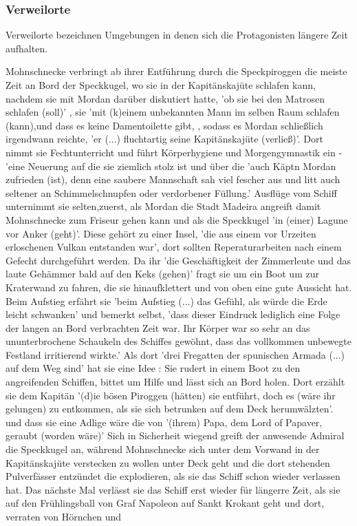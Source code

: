 \subsubsection{Verweilorte}
Verweilorte bezeichnen Umgebungen in denen sich die Protagonisten längere Zeit aufhalten.

Mohnschnecke verbringt ab ihrer Entführung durch die Speckpiroggen \cite[S.32]{pir} die meiste Zeit an Bord der Speckkugel, wo sie in der Kapitänskajüte schlafen kann, nachdem sie mit Mordan darüber diskutiert hatte, 'ob sie bei den Matrosen schlafen (soll)' \cite[S.78]{pir}, sie 'mit (k)einem unbekannten Mann im selben Raum schlafen (kann),\cite[S.78]{pir}und dass es keine Damentoilette gibt, \cite[S.78]{pir}, sodass es Mordan schließlich irgendwann reichte, \cite[S.78]{pir} 'er (...) fluchtartig seine Kapitänskajüte (verließ)'.\cite[S.78]{pir} Dort nimmt sie Fechtunterricht \cite[S.127f]{pir} und führt Körperhygiene und Morgengymnastik ein - 'eine Neuerung auf die sie ziemlich stolz ist \cite[S.181]{pir} und über die 'auch Käptn Mordan zufrieden (ist), denn eine saubere Mannschaft sah viel fescher aus und litt auch seltener an Schimmelschnupfen oder verdorbener Füllung.'\cite[S.181]{pir} Ausflüge vom Schiff unternimmt sie selten,zuerst, als Mordan die Stadt Madeira angreift \cite[S.186ff]{pir} damit Mohnschnecke zum Friseur gehen kann \cite[S.195]{pir} und als die Speckkugel 'in (einer) Lagune vor Anker (geht)'.\cite[S.247]{pir} Diese gehört zu einer Insel, 'die aus einem vor Urzeiten erloschenen Vulkan entstanden war',\cite[S.246]{pir} dort sollten Reperaturarbeiten nach einem Gefecht durchgeführt werden.\cite[S.245f]{pir} Da ihr 'die Geschäftigkeit der Zimmerleute und das laute Gehämmer bald auf den Keks (gehen)'\cite[S.247]{pir} fragt sie um ein Boot um zur Kraterwand zu fahren, die sie hinaufklettert und von oben eine gute Aussicht hat. \cite[S.247f]{pir} Beim Aufstieg erfährt sie 'beim Aufstieg (...) das Gefühl, als würde die Erde leicht schwanken'\cite[S.248]{pir} und bemerkt selbst, 'dass dieser Eindruck lediglich eine Folge der langen an Bord verbrachten Zeit war. Ihr Körper war so sehr an das ununterbrochene Schaukeln des Schiffes gewöhnt, dass das vollkommen unbewegte Festland irritierend wirkte.'\cite[S.248]{pir} Als dort 'drei Fregatten der spunischen Armada (...) auf dem Weg sind'\cite[S.250]{pir} hat sie eine Idee \cite[S.251]{pir}: Sie rudert in einem Boot zu den angreifenden Schiffen, bittet um Hilfe und lässt sich an Bord holen. Dort erzählt sie dem Kapitän '(d)ie bösen Piroggen (hätten) sie entführt, doch es (wäre ihr gelungen) zu entkommen, als sie sich betrunken auf dem Deck herumwälzten'.\cite[S.254]{pir} und dass sie eine Adlige wäre die von '(ihrem) Papa, dem Lord of Papaver, geraubt (worden wäre)'\cite[S.255]{pir} Sich in Sicherheit wiegend greift der anwesende Admiral die Speckkugel an, während Mohnschnecke sich unter dem Vorwand in der Kapitänskajüte verstecken zu wollen unter Deck geht und die dort stehenden Pulverfässer entzündet die explodieren, als sie das Schiff schon wieder verlassen hat. \cite[S.257ff]{pir} Das nächste Mal verlässt sie das Schiff erst wieder für längerre Zeit, als sie auf den Frühlingsball von Graf Napoleon auf Sankt Krokant geht\cite[S.542]{pir} und dort, verraten von Hörnchen und 